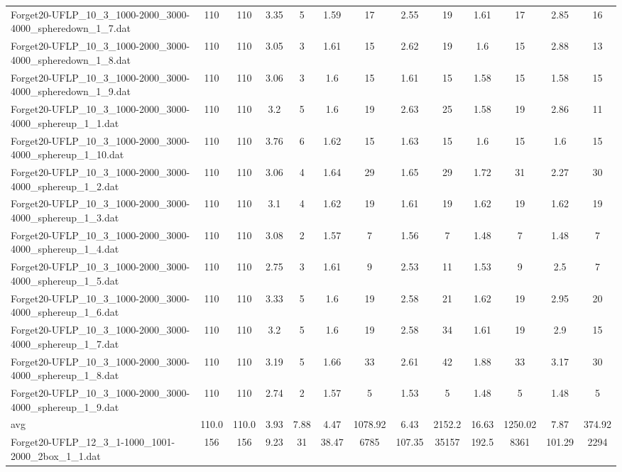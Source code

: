 \begin{table}[!ht]
{\begin{tabular}{lcccccccccccc}
Forget20-UFLP\_10\_3\_1000-2000\_3000-4000\_spheredown\_1\_7.dat & 110 & 110 & 3.35 & 5 & 1.59 & 17 & 2.55 & 19 & 1.61 & 17 & 2.85 & 16 \\
Forget20-UFLP\_10\_3\_1000-2000\_3000-4000\_spheredown\_1\_8.dat & 110 & 110 & 3.05 & 3 & 1.61 & 15 & 2.62 & 19 & 1.6 & 15 & 2.88 & 13 \\
Forget20-UFLP\_10\_3\_1000-2000\_3000-4000\_spheredown\_1\_9.dat & 110 & 110 & 3.06 & 3 & 1.6 & 15 & 1.61 & 15 & 1.58 & 15 & 1.58 & 15 \\
Forget20-UFLP\_10\_3\_1000-2000\_3000-4000\_sphereup\_1\_1.dat & 110 & 110 & 3.2 & 5 & 1.6 & 19 & 2.63 & 25 & 1.58 & 19 & 2.86 & 11 \\
Forget20-UFLP\_10\_3\_1000-2000\_3000-4000\_sphereup\_1\_10.dat & 110 & 110 & 3.76 & 6 & 1.62 & 15 & 1.63 & 15 & 1.6 & 15 & 1.6 & 15 \\
Forget20-UFLP\_10\_3\_1000-2000\_3000-4000\_sphereup\_1\_2.dat & 110 & 110 & 3.06 & 4 & 1.64 & 29 & 1.65 & 29 & 1.72 & 31 & 2.27 & 30 \\
Forget20-UFLP\_10\_3\_1000-2000\_3000-4000\_sphereup\_1\_3.dat & 110 & 110 & 3.1 & 4 & 1.62 & 19 & 1.61 & 19 & 1.62 & 19 & 1.62 & 19 \\
Forget20-UFLP\_10\_3\_1000-2000\_3000-4000\_sphereup\_1\_4.dat & 110 & 110 & 3.08 & 2 & 1.57 & 7 & 1.56 & 7 & 1.48 & 7 & 1.48 & 7 \\
Forget20-UFLP\_10\_3\_1000-2000\_3000-4000\_sphereup\_1\_5.dat & 110 & 110 & 2.75 & 3 & 1.61 & 9 & 2.53 & 11 & 1.53 & 9 & 2.5 & 7 \\
Forget20-UFLP\_10\_3\_1000-2000\_3000-4000\_sphereup\_1\_6.dat & 110 & 110 & 3.33 & 5 & 1.6 & 19 & 2.58 & 21 & 1.62 & 19 & 2.95 & 20 \\
Forget20-UFLP\_10\_3\_1000-2000\_3000-4000\_sphereup\_1\_7.dat & 110 & 110 & 3.2 & 5 & 1.6 & 19 & 2.58 & 34 & 1.61 & 19 & 2.9 & 15 \\
Forget20-UFLP\_10\_3\_1000-2000\_3000-4000\_sphereup\_1\_8.dat & 110 & 110 & 3.19 & 5 & 1.66 & 33 & 2.61 & 42 & 1.88 & 33 & 3.17 & 30 \\
Forget20-UFLP\_10\_3\_1000-2000\_3000-4000\_sphereup\_1\_9.dat & 110 & 110 & 2.74 & 2 & 1.57 & 5 & 1.53 & 5 & 1.48 & 5 & 1.48 & 5 \\
\hline avg & 110.0 & 110.0 & 3.93& 7.88 & 4.47& 1078.92 & 6.43& 2152.2 & 16.63& 1250.02 & 7.87& 374.92\\ \hline
Forget20-UFLP\_12\_3\_1-1000\_1001-2000\_2box\_1\_1.dat & 156 & 156 & 9.23 & 31 & 38.47 & 6785 & 107.35 & 35157 & 192.5 & 8361 & 101.29 & 2294 \\

\end{tabular}}
\end{table}
